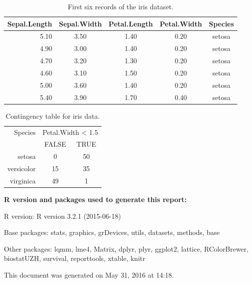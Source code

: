 \documentclass[11pt,a4paper,twoside]{article}\usepackage[]{graphicx}\usepackage[]{color}
\newcommand{\prog}[1]{\textsf{#1}}
\begin{document}
\begin{table}[!ht]
\centering
{\footnotesize
\begin{tabular}{rcccc}
  \hline
Sepal.Length & Sepal.Width & Petal.Length & Petal.Width & Species \\ 
  \hline
5.10 & 3.50 & 1.40 & 0.20 & setosa \\ 
  4.90 & 3.00 & 1.40 & 0.20 & setosa \\ 
  4.70 & 3.20 & 1.30 & 0.20 & setosa \\ 
  4.60 & 3.10 & 1.50 & 0.20 & setosa \\ 
  5.00 & 3.60 & 1.40 & 0.20 & setosa \\ 
  5.40 & 3.90 & 1.70 & 0.40 & setosa \\ 
   \hline
\end{tabular}
}
\caption{First six records of the iris dataset.} 
\label{tbl:head}
\end{table}
\begin{table}[!ht]
\centering
{\footnotesize
\begin{tabular}{r|cc}
  \hline Species & \multicolumn{2}{c}{Petal.Width < 1.5} \\ & FALSE & TRUE \\ 
  \hline
setosa &   0 &  50 \\ 
  versicolor &  15 &  35 \\ 
  virginica &  49 &   1 \\ 
   \hline
\end{tabular}
}
\caption{Contingency table for iris data.} 
\label{tbl:cont}
\end{table}


\nocite{R}




\vfill

\footnotesize

{\bf \prog{R} version and packages used to generate this report:}

\prog{R} version: \textsf{R version 3.2.1 (2015-06-18)}

Base packages: \textsf{stats, graphics, grDevices, utils, datasets, methods, base}

Other packages: \textsf{lqmm, lme4, Matrix, dplyr, plyr, ggplot2, lattice, RColorBrewer, biostatUZH, survival, reporttools, xtable, knitr}

This document was generated on May 31, 2016 at 14:18.
\end{document}
